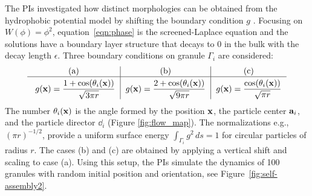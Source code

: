 The PIs investigated how 
distinct morphologies can be obtained from 
the hydrophobic potential model by shifting the boundary condition $g$ \cite{fu-ryh-qua-you2022}.
Focusing on  $W(\phi) = \phi^2$,
equation~\eqref{eqn:phase} is the screened-Laplace equation
and the solutions have a boundary layer structure that decays to $0$ in the
bulk with the decay length $\epsilon$.
Three boundary conditions
on granule $\Gamma_i$ are considered:
\begin{equation}
  \label{eq:bcs}
  \begin{tabular}{c|c|c}
     \text{(a)} & \text{(b)} & \text{(c)} \\
    \hline
    \rule{0pt}{4ex} 
      $g(\mathbf{x}) = \displaystyle \frac{1+\cos (\theta_i(\xx))}{\sqrt{3\pi r}}$
    & $g(\mathbf{x}) = \displaystyle \frac{2+\cos (\theta_i(\xx))}{\sqrt{9\pi r}}$
    & $g(\mathbf{x}) = \displaystyle \frac{\cos (\theta_i(\xx))}{\sqrt{\pi r}}$
\end{tabular}
\end{equation}
The number $\theta_i(\xx)$ is the angle formed by the position $\xx$, the
particle center $\aa_i$, and the particle director $\dd_i$ (Figure \ref{fig:flow_map}).
The normalizations e.g., $(\pi r)^{-1/2}$, provide a uniform
surface energy $\int_{\Gamma_i} g^2 \,ds = 1$ for circular particles
of radius $r$. 
The cases (b) and (c) are obtained by applying a vertical shift
and scaling to case (a).
Using this setup, the PIs simulate the dynamics of 100 granules with random
initial position and orientation, see Figure~\ref{fig:self-assembly2}.

